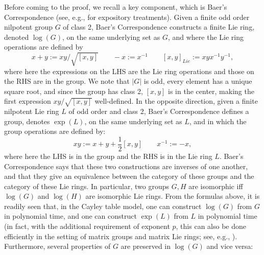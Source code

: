Before coming to the proof, we recall a key component, which is Baer's Correspondence \cite{Bae38} (see, e.g., \cite{khukhro,naik} for expository treatments). Given a finite odd order nilpotent group $G$ of class 2, Baer's Correspondence constructs a finite Lie ring, denoted $\log(G)$, on the same underlying set as $G$, and where the Lie ring operations are defined by
\[
x + y := xy / \sqrt{[x,y]} \qquad -x := x^{-1} \qquad [x,y]_{Lie} := xyx^{-1} y^{-1},
\]
where here the expressions on the LHS are the Lie ring operations and those on the RHS are in the group. We note that $|G|$ is odd, every element has a unique square root, and since the group has class 2, $[x,y]$ is in the center, making the first expression $xy / \sqrt{[x,y]}$ well-defined. In the opposite direction, given a finite nilpotent Lie ring $L$ of odd order and class 2, Baer's Correspondence defines a group, denotes $\exp(L)$, on the same underlying set as $L$, and in which the group operations are defined by:
\[
xy := x + y + \frac{1}{2}[x,y] \qquad x^{-1} := -x,
\]
where here the LHS is in the group and the RHS is in the Lie ring $L$. Baer's Correspondence says that these two constructions are inverses of one another, and that they give an equivalence between the category of these groups and the category of these Lie rings. In particular, two groups $G,H$ are isomorphic iff $\log(G)$ and $\log(H)$ are isomorphic Lie rings. From the formulas above, it is readily seen that, in the Cayley table model, one can construct $\log(G)$ from $G$ in polynomial time, and one can construct $\exp(L)$ from $L$ in polynomial time (in fact, with the additional requirement of exponent $p$, this can also be done efficiently in the setting of matrix groups and matrix Lie rings; see, e.g., \cite[Sec.~6.2]{TI2}). Furthermore, several properties of $G$ are preserved in $\log(G)$ and vice versa:
